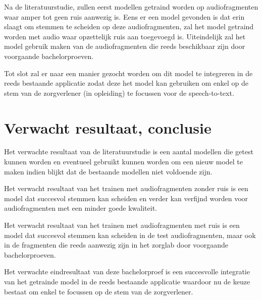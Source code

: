 Na de literatuurstudie, zullen eerst modellen getraind worden op audiofragmenten waar amper tot geen ruis aanwezig is. Eens er een model gevonden is dat erin slaagt om stemmen te scheiden op deze audiofragmenten, zal het model getraind worden met audio waar opzettelijk ruis aan toegevoegd is. Uiteindelijk zal het model gebruik maken van de audiofragmenten die reeds beschikbaar zijn door voorgaande bachelorproeven.

Tot slot zal er naar een manier gezocht worden om dit model te integreren in de reeds bestaande applicatie zodat deze het model kan gebruiken om enkel op de stem van de zorgverlener (in opleiding) te focussen voor de speech-to-text.

\section{Verwacht resultaat, conclusie}%
\label{sec:verwachte_resultaten}

Het verwachte resultaat van de literatuurstudie is een aantal modellen die getest kunnen worden en eventueel gebruikt kunnen worden om een nieuw model te maken indien blijkt dat de bestaande modellen niet voldoende zijn.

Het verwacht resultaat van het trainen met audiofragmenten zonder ruis is een model dat succesvol stemmen kan scheiden en verder kan verfijnd worden voor audiofragmenten met een minder goede kwaliteit.

Het verwacht resultaat van het trainen met audiofragmenten met ruis is een model dat succesvol stemmen kan scheiden in de test audiofragmenten, maar ook in de fragmenten die reeds aanwezig zijn in het zorglab door voorgaande bachelorproeven.

Het verwachte eindresultaat van deze bachelorproef is een succesvolle integratie van het getrainde model in de reeds bestaande applicatie waardoor nu de keuze bestaat om enkel te focussen op de stem van de zorgverlener.

